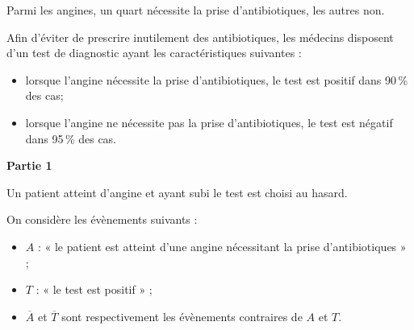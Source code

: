 
\medskip

Parmi les angines, un quart nécessite la prise d'antibiotiques, les autres non.

Afin d'éviter de prescrire inutilement des antibiotiques, les médecins disposent d'un test de diagnostic ayant les caractéristiques suivantes :

\begin{itemize}
\item[$\bullet~~$]lorsque l'angine nécessite la prise d'antibiotiques, le test est positif dans 90\,\% des cas;
\item[$\bullet~~$]lorsque l'angine ne nécessite pas la prise d'antibiotiques, le test est négatif dans 95\,\% des cas.
\end{itemize}

%

\bigskip

\textbf{Partie 1}

\medskip

Un patient atteint d'angine et ayant subi le test est choisi au hasard. 

On considère les évènements suivants :

\begin{itemize}
\item[$\bullet~~$]$A$ : « le patient est atteint d'une angine nécessitant la prise d'antibiotiques »{} ; 
\item[$\bullet~~$]$T$ : « le test est positif »{} ;
\item[$\bullet~~$]$\overline{A}$ et $\overline{T}$ sont respectivement les évènements contraires de $A$ et $T$.
\end{itemize}


